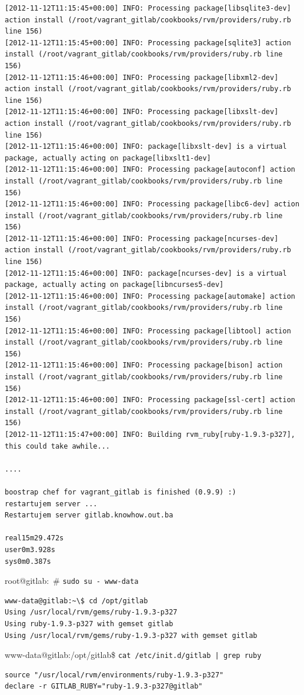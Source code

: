 \documentclass[times, utf8, seminar]{fit}
\begin{document}
\begin{lstlisting}
[2012-11-12T11:15:45+00:00] INFO: Processing package[libsqlite3-dev] action install (/root/vagrant_gitlab/cookbooks/rvm/providers/ruby.rb line 156)
[2012-11-12T11:15:45+00:00] INFO: Processing package[sqlite3] action install (/root/vagrant_gitlab/cookbooks/rvm/providers/ruby.rb line 156)
[2012-11-12T11:15:46+00:00] INFO: Processing package[libxml2-dev] action install (/root/vagrant_gitlab/cookbooks/rvm/providers/ruby.rb line 156)
[2012-11-12T11:15:46+00:00] INFO: Processing package[libxslt-dev] action install (/root/vagrant_gitlab/cookbooks/rvm/providers/ruby.rb line 156)
[2012-11-12T11:15:46+00:00] INFO: package[libxslt-dev] is a virtual package, actually acting on package[libxslt1-dev]
[2012-11-12T11:15:46+00:00] INFO: Processing package[autoconf] action install (/root/vagrant_gitlab/cookbooks/rvm/providers/ruby.rb line 156)
[2012-11-12T11:15:46+00:00] INFO: Processing package[libc6-dev] action install (/root/vagrant_gitlab/cookbooks/rvm/providers/ruby.rb line 156)
[2012-11-12T11:15:46+00:00] INFO: Processing package[ncurses-dev] action install (/root/vagrant_gitlab/cookbooks/rvm/providers/ruby.rb line 156)
[2012-11-12T11:15:46+00:00] INFO: package[ncurses-dev] is a virtual package, actually acting on package[libncurses5-dev]
[2012-11-12T11:15:46+00:00] INFO: Processing package[automake] action install (/root/vagrant_gitlab/cookbooks/rvm/providers/ruby.rb line 156)
[2012-11-12T11:15:46+00:00] INFO: Processing package[libtool] action install (/root/vagrant_gitlab/cookbooks/rvm/providers/ruby.rb line 156)
[2012-11-12T11:15:46+00:00] INFO: Processing package[bison] action install (/root/vagrant_gitlab/cookbooks/rvm/providers/ruby.rb line 156)
[2012-11-12T11:15:46+00:00] INFO: Processing package[ssl-cert] action install (/root/vagrant_gitlab/cookbooks/rvm/providers/ruby.rb line 156)
[2012-11-12T11:15:47+00:00] INFO: Building rvm_ruby[ruby-1.9.3-p327], this could take awhile...

....

boostrap chef for vagrant_gitlab is finished (0.9.9) :)
restartujem server ...
Restartujem server gitlab.knowhow.out.ba

real15m29.472s
user0m3.928s
sys0m0.387s
\end{lstlisting}

root@gitlab:~# \verb+sudo su - www-data+
\begin{lstlisting}
www-data@gitlab:~\$ cd /opt/gitlab
Using /usr/local/rvm/gems/ruby-1.9.3-p327
Using ruby-1.9.3-p327 with gemset gitlab
Using /usr/local/rvm/gems/ruby-1.9.3-p327 with gemset gitlab
\end{lstlisting}


www-data@gitlab:/opt/gitlab\$ \verb+cat /etc/init.d/gitlab | grep ruby+
\begin{lstlisting}
source "/usr/local/rvm/environments/ruby-1.9.3-p327"
declare -r GITLAB_RUBY="ruby-1.9.3-p327@gitlab"
\end{lstlisting}
\end{document}
